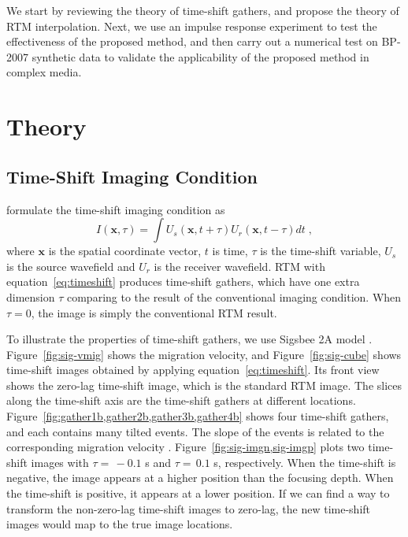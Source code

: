 We start by reviewing the theory of time-shift gathers, and propose the theory of RTM interpolation.
Next, we use an impulse response experiment to test the effectiveness of the proposed method, 
and then carry out a numerical test on BP-2007 synthetic data to validate the applicability of the proposed method in complex media.

\section{Theory}

\subsection{Time-Shift Imaging Condition}

\cite{sava06} formulate the time-shift imaging condition as
\begin{equation}
I(\mathbf{x},\tau) = \int U_s(\mathbf{x},t+\tau) U_r(\mathbf{x},t-\tau) dt \; ,
\label{eq:timeshift}
\end{equation}
where $\mathbf{x}$ is the spatial coordinate vector, $t$ is time, $\tau$ is the time-shift variable, $U_s$ is the source wavefield
and $U_r$ is the receiver wavefield.
RTM with equation~\ref{eq:timeshift} produces time-shift gathers, which have one extra dimension $\tau$ 
comparing to the result of the conventional imaging condition. 
When $\tau=0$, the image is simply the conventional RTM result. 

To illustrate the properties of time-shift gathers, we use Sigsbee 2A model \cite[]{paffenholz02}.
Figure~\ref{fig:sig-vmig} shows the migration velocity, and
Figure~\ref{fig:sig-cube} shows time-shift images obtained by applying equation~\ref{eq:timeshift}.
Its front view shows the zero-lag time-shift image, which is the standard RTM image.
The slices along the time-shift axis are the time-shift gathers at different locations.
Figure~\ref{fig:gather1b,gather2b,gather3b,gather4b} shows four time-shift gathers, 
and each contains many tilted events. 
The slope of the events is related to the corresponding migration velocity \cite[]{sava06}.
Figure~\ref{fig:sig-imgn,sig-imgp} plots two time-shift images with $\tau= \, -0.1$ s and $\tau= \, 0.1$ s, respectively.
When the time-shift is negative, the image appears at a higher position than the focusing depth.
When the time-shift is positive, it appears at a lower position.
If we can find a way to transform the non-zero-lag time-shift images to zero-lag, the new time-shift images would map to the true image locations.

